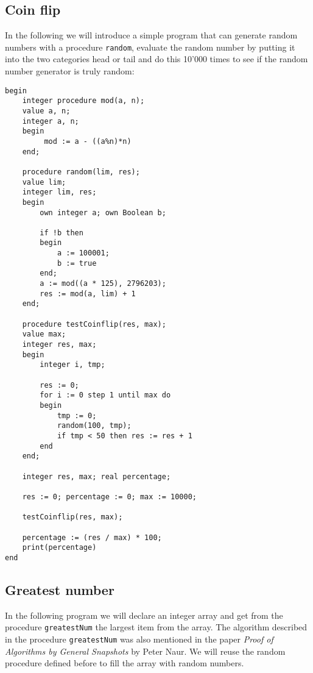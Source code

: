\documentclass{article}
\begin{document}
\subsection{Coin flip}
In the following we will introduce a simple program that can generate random numbers with a procedure \texttt{random}, evaluate the random number by putting it into the two categories head or tail and do this 10'000 times to see if the random number generator is truly random:

\begin{lstlisting}[language={[60]algol}]
begin
    integer procedure mod(a, n);
    value a, n;
    integer a, n;
    begin
         mod := a - ((a%n)*n)
    end;
 
    procedure random(lim, res);
    value lim;
    integer lim, res;
    begin
        own integer a; own Boolean b;
        
        if !b then
        begin
            a := 100001;
            b := true
        end;
        a := mod((a * 125), 2796203);
        res := mod(a, lim) + 1
    end;
    
    procedure testCoinflip(res, max);
    value max;
    integer res, max;
    begin
        integer i, tmp;
        
        res := 0; 
        for i := 0 step 1 until max do
        begin
            tmp := 0;
            random(100, tmp);
            if tmp < 50 then res := res + 1
        end
    end;
    
    integer res, max; real percentage;
    
    res := 0; percentage := 0; max := 10000;
    
    testCoinflip(res, max);
    
    percentage := (res / max) * 100;
    print(percentage)
end    
\end{lstlisting}

\subsection{Greatest number}
In the following program we will declare an integer array and get from the procedure \texttt{greatestNum} the largest item from the array. The algorithm described in the procedure \texttt{greatestNum} was also mentioned in the paper \textit{Proof of Algorithms by General Snapshots} by Peter Naur. We will reuse the random procedure defined before to fill the array with random numbers.
\end{document}
